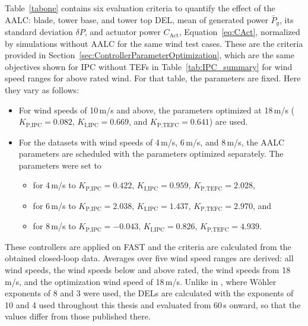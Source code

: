 %
Table~\ref{tabone} contains six evaluation criteria to quantify the effect of the AALC: blade, tower base, and tower top DEL, mean of generated power $\bar{P}_{g}$, its standard deviation $\delta P$, and actuator power $C_{\text{Act}}$, Equation~\eqref{eq:CAct}, normalized by simulations without AALC for the same wind test cases. These are the criteria provided in Section~\ref{sec:ControllerParameterOptimization}, which are the same objectives shown for IPC without TEFs in Table~\ref{tab:IPC_summary} for wind speed ranges for above rated wind. For that table, the parameters are fixed. Here they vary as follows:
\begin{itemize}
    \item For wind speeds of 10\,m/s and above, the parameters optimized at 18\,m/s ($K_{\text{P,IPC}} = 0.082$, $K_{\text{I,IPC}} = 0.669$, and $K_{\text{P,TEFC}} = 0.641$) are used.
    \item For the datasets with wind speeds of 4\,m/s, 6\,m/s, and 8\,m/s, the AALC parameters are scheduled with the parameters optimized separately. The parameters were set to
    \begin{itemize}
        \item for  4\,m/s to $K_{\text{P,IPC}} = 0.422$,  $K_{\text{I,IPC}} = 0.959$,  $K_{\text{P,TEFC}} =  2.028$,
        \item for  6\,m/s to $K_{\text{P,IPC}} =2.038$,  $K_{\text{I,IPC}} = 1.437$,  $K_{\text{P,TEFC}} = 2.970$, and
        \item for  8\,m/s to $K_{\text{P,IPC}} =-0.043$,  $K_{\text{I,IPC}} = 0.826 $,  $K_{\text{P,TEFC}} = 4.939$.
    \end{itemize}
\end{itemize}
These controllers are applied on FAST and the criteria are calculated from the obtained closed-loop data. Averages over five wind speed ranges are derived: all wind speeds, the wind speeds below and above rated, the wind speeds from 18\,m/s, and the optimization wind speed of 18\,m/s. Unlike in \cite{dittmer2024combined}, where W\"ohler exponents of 8 and 3 were used, the DELs are calculated with the exponents of 10 and 4 used throughout this thesis and evaluated from 60\,s onward, so that the values differ from those published there.

